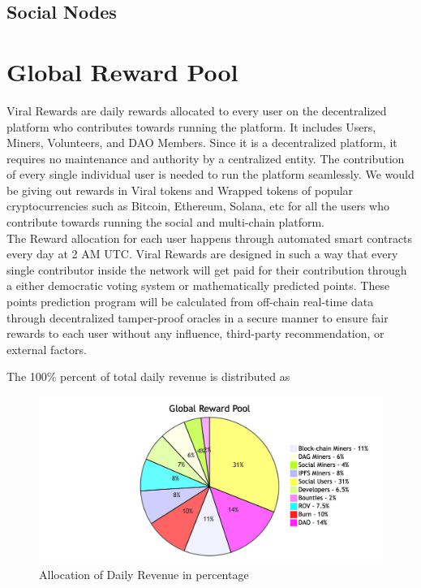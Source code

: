 \documentclass[10pt]{article}
\begin{document}
\subsection{Social Nodes}


\section{Global Reward Pool}

Viral Rewards are daily rewards allocated to every user on the decentralized platform who contributes towards running the platform. It includes Users, Miners, Volunteers, and DAO Members. Since it is a decentralized platform, it requires no maintenance and authority by a centralized entity. The contribution of every single individual user is needed to run the platform seamlessly. We would be giving out rewards in Viral tokens and Wrapped tokens of popular cryptocurrencies such as Bitcoin, Ethereum, Solana, etc for all the users who contribute towards running the social and multi-chain platform.\\

The Reward allocation for each user happens through automated smart contracts every day at 2 AM UTC. Viral Rewards are designed in such a way that every single contributor inside the network will get paid for their contribution through a either democratic voting system or mathematically predicted points. These points prediction program will be calculated from off-chain real-time data through decentralized tamper-proof oracles in a secure  manner to ensure fair rewards to each user without any influence, third-party recommendation, or external factors. 

The 100\% percent of total daily revenue is distributed as \\
\begin{figure}[H]
\begin{center}
\includegraphics[width=14cm]{global-reward}
\caption{Allocation of Daily Revenue in percentage}
\end{center}
\end{figure}
\end{document}
